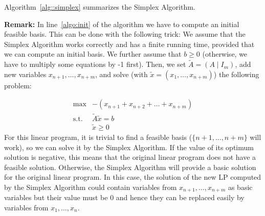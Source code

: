 \documentclass[12pt, showidx, twoside]{article}
\begin{document}
{{{%
Algorithm~\ref{alg::simplex} summarizes the {\sc Simplex Algorithm}.



{\bf Remark:} In line~\ref{algo:init} of the algorithm we have to compute an 
initial feasible basis. This can be done with the following trick: 
We assume that the {\sc Simplex Algorithm} works correctly and has a finite
running time, provided that we can compute an initial basis.
We further assume that $b\geq 0$ (otherwise, we have to multiply some 
equations by -1 first).
Then, we set $\tilde A = \left(A \mid I_m\right)$, %
add new variables 
$x_{n+1},\dots,x_{n+m}$, and solve (with $\tilde x = (x_1,\dots,x_{n+m})$)
the following problem:

\begin{equation}
\begin{array}{rl}
\max & -(x_{n+1} + x_{n+2} + \dots + x_{n+m}) \\
 \mbox{s.t.} & \tilde A \tilde x = b\\
 & \tilde x \geq 0
\end{array}
\end{equation}
For this linear program, it is trivial to find a feasible basis 
(${\{n+1,\dots,n+m\}}$ will work), so we can solve it by
the {\sc Simplex Algorithm}. If the value of its optimum solution
is negative, this means that the original linear program does not
have a feasible solution. Otherwise, the {\sc Simplex Algorithm}
will provide a basic solution for the original linear program.
In this case, the solution of the new LP computed by the
{\sc Simplex Algorithm} could contain variables from $x_{n+1},\dots,x_{n+m}$
as basic variables but their value must be $0$ and hence they can be
replaced easily by variables from $x_1,\dots,x_n$.


}}}
\end{document}
